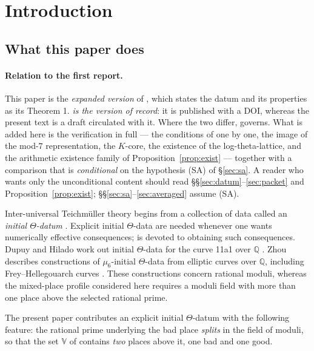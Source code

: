 \documentclass[11pt]{article}
\theoremstyle{plain}
\theoremstyle{definition}
\newcommand{\VV}{\mathbb{V}}
\newcommand{\SA}{\textup{(SA)}}
\begin{document}
\tableofcontents

\section{Introduction}\label{sec:intro}

\subsection{What this paper does}

\paragraph{Relation to the first report.}
This paper is the \emph{expanded version} of \cite{First}, which states the datum and
its properties as its Theorem 1.  \emph{\cite{First} is the version of record}: it is
published with a DOI, whereas the present text is a draft circulated with it.  Where the
two differ, \cite{First} governs.  What is added here is the verification in full --- the
conditions of \cite[Definition 3.1]{IUT1} one by one, the image of the mod-$7$
representation, the $K$-core, the existence of the log-theta-lattice, and the arithmetic
existence family of Proposition~\ref{prop:exist} --- together with a comparison that is
\emph{conditional} on the hypothesis \SA{} of \S\ref{sec:sa}.  A reader who wants only
the unconditional content should read \S\S\ref{sec:datum}--\ref{sec:packet} and
Proposition~\ref{prop:exist}; \S\S\ref{sec:sa}--\ref{sec:averaged} assume \SA{}.

Inter-universal Teichm\"uller theory \cite{IUT1,IUT2,IUT3,IUT4} begins from a
collection of data called an \emph{initial $\Theta$-datum}
\cite[Definition 3.1]{IUT1}.  Explicit initial $\Theta$-data are needed whenever
one wants numerically effective consequences; \cite{MFHMP} is devoted to
obtaining such consequences.  Dupuy and Hilado work out initial $\Theta$-data for the curve 11a1
over $\mathbb Q$ \cite[\S2.10]{DH25}.
Zhou describes constructions of $\mu_6$-initial $\Theta$-data from
elliptic curves over $\mathbb Q$, including Frey--Hellegouarch curves
\cite[Prop.~2.5, Lemma~2.6]{Zhou}.
These constructions concern rational moduli, whereas the mixed-place
profile considered here requires a moduli field with more than one
place above the selected rational prime.

The present paper contributes an explicit initial
$\Theta$-datum with the following feature: the rational prime underlying the bad place \emph{splits} in
the field of moduli, so that the set $\VV$ of \cite[Definition 3.1(e)]{IUT1} 
contains \emph{two} places above it, one bad and one good.
\end{document}
